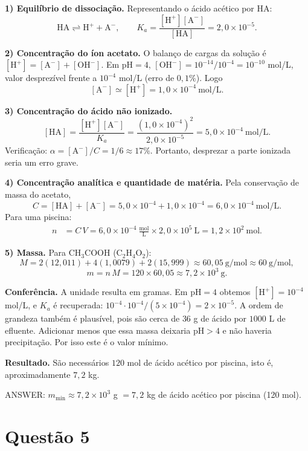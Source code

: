 \documentclass{article}%
\begin{document}
\textbf{1) Equilíbrio de dissociação.} Representando o ácido acético por $\text{HA}$:
\[
\text{HA} \rightleftharpoons \text{H}^+ + \text{A}^- ,\qquad K_a=\frac{[\text{H}^+][\text{A}^-]}{[\text{HA}]}=2{,}0\times10^{-5}.
\]

\textbf{2) Concentração do íon acetato.} O balanço de cargas da solução é $[\text{H}^+]=[\text{A}^-]+[\text{OH}^-]$. Em $\text{pH}=4$, $[\text{OH}^-]=10^{-14}/10^{-4}=10^{-10}$ mol/L, valor desprezível frente a $10^{-4}$ mol/L (erro de $0{,}1\%$). Logo
\[
[\text{A}^-]\simeq[\text{H}^+]=1{,}0\times10^{-4}\ \text{mol/L}.
\]

\textbf{3) Concentração do ácido não ionizado.}
\[
[\text{HA}]=\frac{[\text{H}^+][\text{A}^-]}{K_a}=\frac{(1{,}0\times10^{-4})^2}{2{,}0\times10^{-5}}=5{,}0\times10^{-4}\ \text{mol/L}.
\]
Verificação: $\alpha=[\text{A}^-]/C=1/6\approx 17\%$. Portanto, desprezar a parte ionizada seria um erro grave.

\textbf{4) Concentração analítica e quantidade de matéria.} Pela conservação de massa do acetato,
\[
C=[\text{HA}]+[\text{A}^-]=5{,}0\times10^{-4}+1{,}0\times10^{-4}=6{,}0\times10^{-4}\ \text{mol/L}.
\]
Para uma piscina:
\begin{align*}
n &= C\,V = 6{,}0\times10^{-4}\ \tfrac{\text{mol}}{\text{L}}\times 2{,}0\times10^{5}\ \text{L} = 1{,}2\times10^{2}\ \text{mol}.
\end{align*}

\textbf{5) Massa.} Para $\text{CH}_3\text{COOH}$ ($\text{C}_2\text{H}_4\text{O}_2$):
\[
M = 2(12{,}011)+4(1{,}0079)+2(15{,}999)\approx 60{,}05\ \text{g/mol}\approx 60\ \text{g/mol},
\]
\[
m = n\,M = 120\times 60{,}05\approx 7{,}2\times10^{3}\ \text{g}.
\]

\textbf{Conferência.} A unidade resulta em gramas. Em $\text{pH}=4$ obtemos $[\text{H}^+]=10^{-4}$ mol/L, e $K_a$ é recuperada: $10^{-4}\cdot10^{-4}/(5\times10^{-4})=2\times10^{-5}$. A ordem de grandeza também é plausível, pois são cerca de $36$ g de ácido por $1000$ L de efluente. Adicionar menos que essa massa deixaria $\text{pH}>4$ e não haveria precipitação. Por isso este é o valor mínimo.

\textbf{Resultado.} São necessários $120$ mol de ácido acético por piscina, isto é, aproximadamente $7{,}2$ kg.

ANSWER: $m_{\min}\approx 7{,}2\times10^{3}$ g $=7{,}2$ kg de ácido acético por piscina (120 mol).%
\newpage%
\section*{Questão 5}
\end{document}
